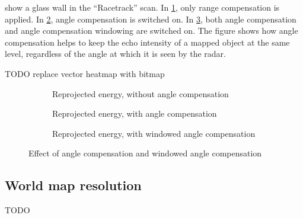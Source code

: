  show a glass wall in the ``Racetrack'' scan. In \cref{fig:fig_angle_compensation_comparison_1}, only range compensation is applied. In \cref{fig:fig_angle_compensation_comparison_2},
angle compensation is switched on. In \cref{fig:fig_angle_compensation_comparison_3}, both angle
compensation and angle compensation windowing are switched on. The
figure shows how angle compensation helps to keep the echo intensity of
a mapped object at the same level, regardless of the angle at which it
is seen by the radar.

TODO replace vector heatmap with bitmap
\begin{figure}[htbp]
    \centering
    \begin{subfigure}{\textwidth}
        \centering
        \def\svgscale{0.8} \small
        
        \caption{Reprojected energy, without angle compensation}
        \label{fig:fig_angle_compensation_comparison_1}
        \bigskip
    \end{subfigure}
    \begin{subfigure}{\textwidth}
        \centering
        \def\svgscale{0.8} \small
        
        \caption{Reprojected energy, with angle compensation}
        \label{fig:fig_angle_compensation_comparison_2}
        \bigskip
    \end{subfigure}
    \begin{subfigure}{\textwidth}
        \centering
        \def\svgscale{0.8} \small
        
        \caption{Reprojected energy, with windowed angle compensation}
        \label{fig:fig_angle_compensation_comparison_3}
        \bigskip
    \end{subfigure}
    \caption{Effect of angle compensation and windowed angle compensation}
    \label{fig:fig_angle_compensation_comparison}
\end{figure}


\subsection{World map resolution}\label{world-map-resolution}

TODO
